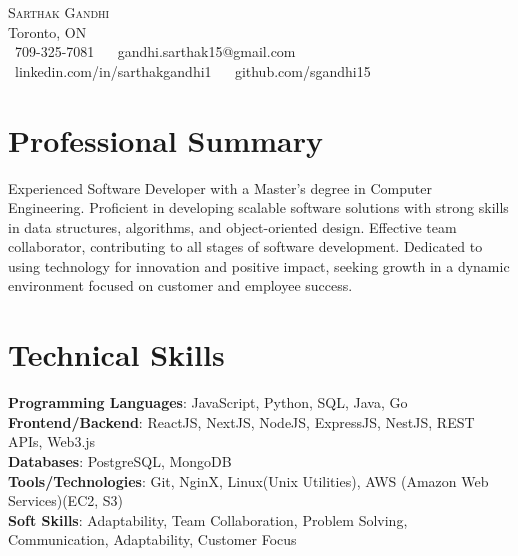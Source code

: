\documentclass[letterpaper,11pt]{article}
\begin{document}
\begin{center}
    {\Huge \scshape Sarthak Gandhi} \\ \vspace{1pt}
    Toronto, ON \\ \vspace{1pt}
    \small \raisebox{-0.1\height}\faPhone\ 709-325-7081 ~ 
    {\raisebox{-0.2\height}\faEnvelope\  {gandhi.sarthak15@gmail.com}} ~ 
    {\raisebox{-0.2\height}\faLinkedin\ {linkedin.com/in/sarthakgandhi1}}  ~
    {\raisebox{-0.2\height}\faGithub\ {github.com/sgandhi15}}
    \vspace{-8pt}
\end{center}


\section{Professional Summary}
Experienced Software Developer with a Master's degree in Computer Engineering. Proficient in developing scalable software solutions with strong skills in data structures, algorithms, and object-oriented design. Effective team collaborator, contributing to all stages of software development. Dedicated to using technology for innovation and positive impact, seeking growth in a dynamic environment focused on customer and employee success.
\vspace{-8pt}

\section{Technical Skills}
\begin{itemize}[leftmargin=0.15in, label={}]
\small{\item{
\textbf{Programming Languages}{: JavaScript, Python, SQL, Java, Go} \\
\textbf{Frontend/Backend}{: ReactJS, NextJS, NodeJS, ExpressJS, NestJS, REST APIs, Web3.js} \\
\textbf{Databases}{: PostgreSQL, MongoDB} \\
\textbf{Tools/Technologies}{: Git, NginX, Linux(Unix Utilities), AWS (Amazon Web Services)(EC2, S3)} \\
\textbf{Soft Skills}{: Adaptability, Team Collaboration, Problem Solving, Communication, Adaptability, Customer Focus} \\
}}
\end{itemize}
\vspace{-16pt}
\end{document}
